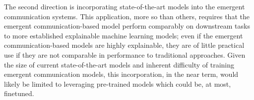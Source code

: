 The second direction is incorporating state-of-the-art models into the emergent communication systems.
This application, more so than others, requires that the emergent communication-based model perform comparably on downstream tasks to more established explainable machine learning models;
  even if the emergent communication-based models are highly explainable, they are of little practical use if they are not comparable in performance to traditional approaches.
Given the size of current state-of-the-art models and inherent difficulty of training emergent communication models, this incorporation, in the near term, would likely be limited to leveraging pre-trained models which could be, at most, finetuned.

